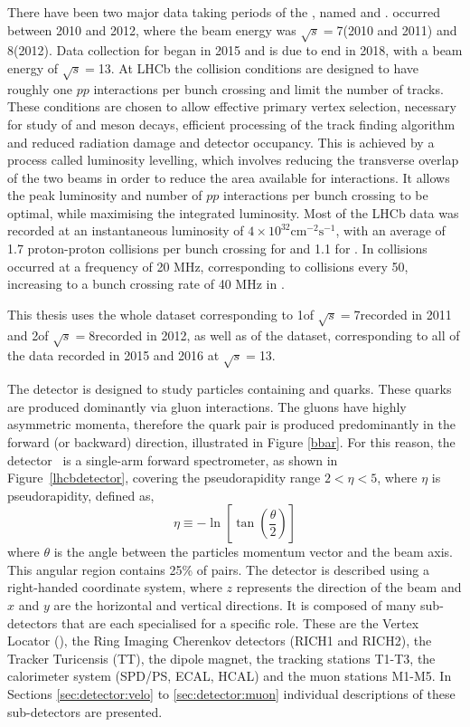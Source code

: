 There have been two major data taking periods of the \lhc, named \runone and \runtwo. \runone occurred between 2010 and 2012, where the beam energy was $\sqrt{s}=$7\tev (2010 and 2011) and 8\tev (2012). Data collection for \runtwo began in 2015 and is due to end in 2018, with a beam energy of $\sqrt{s}=$13\tev. At LHCb the collision conditions are designed to have roughly one $pp$ interactions per bunch crossing and limit the number of tracks. These conditions are chosen to allow effective primary vertex selection, necessary for study of \B and \D meson decays, efficient processing of the track finding algorithm and reduced radiation damage and detector occupancy. This is achieved by a process called luminosity levelling, which involves reducing the transverse overlap of the two beams in order to reduce the area available for interactions. It allows the peak luminosity and number of $pp$ interactions per bunch crossing to be optimal, while maximising the integrated luminosity. Most of the LHCb data was recorded at an instantaneous luminosity of $4 \times 10^{32}\text{cm}^{-2}\text{s}^{-1}$, with an average of 1.7 proton-proton collisions per bunch crossing for \runone and 1.1 for \runtwo. In \runone collisions occurred at a frequency of 20 MHz, corresponding to collisions every 50\ns, increasing to a bunch crossing rate of 40 MHz in \runtwo.

This thesis uses the whole \runonelumi \runone dataset corresponding to 1\invfb of $\sqrt{s}=$7\tev recorded in 2011 and 2\invfb of $\sqrt{s}=$8\tev recorded in 2012, as well as \runtwolumi of the \runtwo dataset, corresponding to all of the data recorded in 2015 and 2016 at $\sqrt{s}=$13\tev.

The \lhcb detector is designed to study particles containing \bquark and \cquark quarks. These quarks are produced dominantly via gluon interactions. The gluons have highly asymmetric momenta, therefore the \bquark\bquarkbar quark pair is produced predominantly in the forward (or backward) direction, illustrated in Figure \ref{bbar}. For this reason, the \lhcb detector~\cite{Alves:2008zz,LHCb-DP-2014-002} is a single-arm forward spectrometer, as shown in Figure~\ref{lhcbdetector}, covering the \mbox{pseudorapidity} range $2<\eta <5$, where $\eta$ is pseudorapidity, defined as,
\begin{equation}
\eta \equiv -\ln \left[ \tan \left( \frac{\theta}{2} \right) \right]
\end{equation}
where $\theta$ is the angle between the particles momentum vector and the beam axis. This angular region contains 25\% of \bquark\bquarkbar pairs. The detector is described using a right-handed coordinate system, where $z$ represents the direction of the beam and $x$ and $y$ are the horizontal and vertical directions. It is composed of many sub-detectors that are each specialised for a specific role. These are the Vertex Locator (\velo), the Ring Imaging Cherenkov detectors (RICH1 and RICH2), the Tracker Turicensis (TT), the dipole magnet, the tracking stations T1-T3, the calorimeter system (SPD/PS, ECAL, HCAL) and the muon stations M1-M5. In Sections \ref{sec:detector:velo} to \ref{sec:detector:muon} individual descriptions of these sub-detectors are presented.

